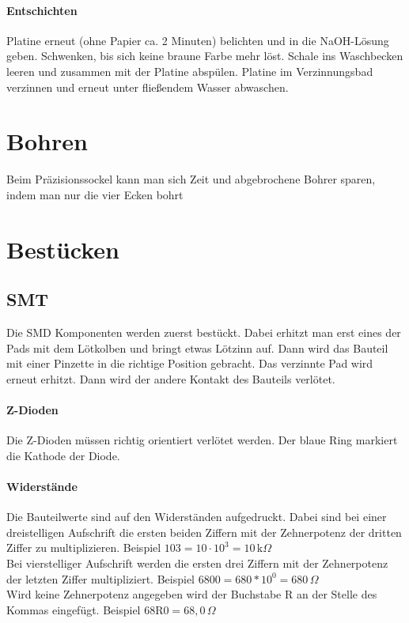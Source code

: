 \paragraph*{Entschichten} Platine erneut (ohne Papier ca. 2 Minuten) belichten und in die NaOH-Lösung geben. Schwenken, bis sich keine braune Farbe mehr löst.
Schale ins Waschbecken leeren und zusammen mit der Platine abspülen.
Platine im Verzinnungsbad verzinnen und erneut unter fließendem Wasser abwaschen.
\section{Bohren}
Beim Präzisionssockel kann man sich Zeit und abgebrochene Bohrer sparen, indem man nur die vier Ecken bohrt
\section{Bestücken}
\subsection{SMT}
Die SMD Komponenten werden zuerst bestückt.
Dabei erhitzt man erst eines der Pads mit dem Lötkolben und bringt etwas Lötzinn auf. Dann wird das Bauteil mit einer Pinzette in die richtige Position gebracht. Das verzinnte Pad wird erneut erhitzt. Dann wird der andere Kontakt des Bauteils verlötet.
\paragraph*{Z-Dioden} Die Z-Dioden müssen richtig orientiert verlötet werden. Der blaue Ring markiert die Kathode der Diode. 


\paragraph*{Widerstände} Die Bauteilwerte sind auf den Widerständen aufgedruckt.
Dabei sind bei einer dreistelligen Aufschrift die ersten beiden Ziffern mit der Zehnerpotenz der dritten Ziffer zu multiplizieren. Beispiel $103 = 10 \cdot 10^3 = 10\,\mathrm{k}\Omega$\\
Bei vierstelliger Aufschrift werden die ersten drei Ziffern mit der Zehnerpotenz der letzten Ziffer multipliziert. Beispiel $6800 = 680 * 10^0 = 680\,\Omega$\\
Wird keine Zehnerpotenz angegeben wird der Buchstabe R an der Stelle des Kommas eingefügt. Beispiel $68\mathrm{R}0 = 68,0\,\Omega$

